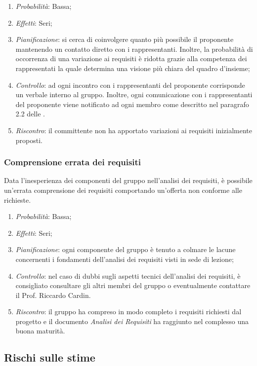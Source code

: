 \begin{enumerate}
\item \textit{Probabilità}: Bassa;
\item \textit{Effetti}: Seri;
\item \textit{Pianificazione}: si cerca di coinvolgere quanto più possibile il proponente mantenendo un contatto diretto con i rappresentanti. Inoltre, la probabilità di occorrenza di una variazione ai requisiti è ridotta grazie alla competenza dei rappresentati la quale determina una visione più chiara del quadro d'insieme;
\item \textit{Controllo}: ad ogni incontro con i rappresentanti del proponente corrisponde un verbale interno al gruppo. Inoltre, ogni comunicazione con i rappresentanti del proponente viene notificato ad ogni membro come descritto nel paragrafo 2.2 delle \NormeDiProgetto.
\item \textit{Riscontro}: il committente non ha apportato variazioni ai requisiti inizialmente proposti.  
\end{enumerate}
		
		\subsubsection{Comprensione errata dei requisiti}

Data l'inesperienza dei componenti del gruppo nell'analisi dei requisiti, è possibile un'errata comprensione dei requisiti comportando un'offerta non conforme alle richieste.

\begin{enumerate}
\item \textit{Probabilità}: Bassa;
\item \textit{Effetti}: Seri;
\item \textit{Pianificazione}: ogni componente del gruppo è tenuto a colmare le lacune concernenti i fondamenti dell'analisi dei requisiti visti in sede di lezione;
\item \textit{Controllo}: nel caso di dubbi sugli aspetti tecnici dell'analisi dei requisiti, è consigliato consultare gli altri membri del gruppo o eventualmente contattare il Prof. Riccardo Cardin.
\item \textit{Riscontro}: il gruppo ha compreso in modo completo i requisiti richiesti dal progetto e il documento \textit{Analisi dei Requisiti} ha raggiunto nel complesso una buona maturità.
\end{enumerate}

	\subsection{Rischi sulle stime}
	
